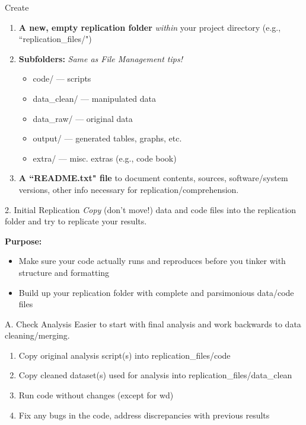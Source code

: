 \documentclass[12pt, compress, handout]{beamer}
\renewcommand{\texttt}[2][ceruleanblue]{\textcolor{#1}{\ttfamily #2}}
\let\noteitem\item %
\renewcommand{\item}{ 
	\noteitem\vspace{\fill}
	}
\newcommand{\nb}[1]{{\color{burntorange} {#1}}}
\begin{document}
		 \begin{frame}{Create}
		 	\begin{enumerate}
		 		\item \textbf{A new, empty replication folder} \textit{within} your project directory (e.g., ``\texttt{replication\_files/}") 
		 		\item \textbf{Subfolders:} \textit{Same as File Management tips!}
		 			\begin{itemize}
		 				\item \texttt{code/} --- scripts
		 				\item \texttt{data\_clean/} --- manipulated data
		 				\item \texttt{data\_raw/} --- original data
		 				\item \texttt{output/} --- generated tables, graphs, etc.
		 				\item \texttt{extra/} --- misc. extras (e.g., code book)
		 			\end{itemize}
		 			\item \textbf{A ``README.txt" file} to document contents, sources, software/system versions, other info necessary for replication/comprehension.
		 	\end{enumerate}
		 \end{frame}
		
		 \begin{frame}{2. Initial Replication}
		 	\textit{Copy} (don't move!) data and code files into the replication folder and \nb{try to replicate your results}.
		 	
		 	\bigskip
		 	\pause
		 	\textbf{Purpose:}
			 	\begin{itemize}
			 		\item Make sure your code actually runs and \textcolor{burntorange}{reproduces} before you tinker with structure and formatting
			 		\item Build up your replication folder with \textcolor{burntorange}{complete and parsimonious} data/code files
			 	\end{itemize}
		 \end{frame}
		 
		\begin{frame}{A. Check Analysis}
			Easier to start with final analysis and work backwards to data cleaning/merging. 
			
			\pause
			\begin{enumerate}
				\item Copy original analysis script(s) into \texttt{replication\_files/code}
				\item Copy cleaned dataset(s) used for analysis into \texttt{replication\_files/data\_clean}
				\item Run code without changes (except for wd)
				\item Fix any bugs in the code, address discrepancies with previous results
			\end{enumerate}
		\end{frame}
		
\end{document}
